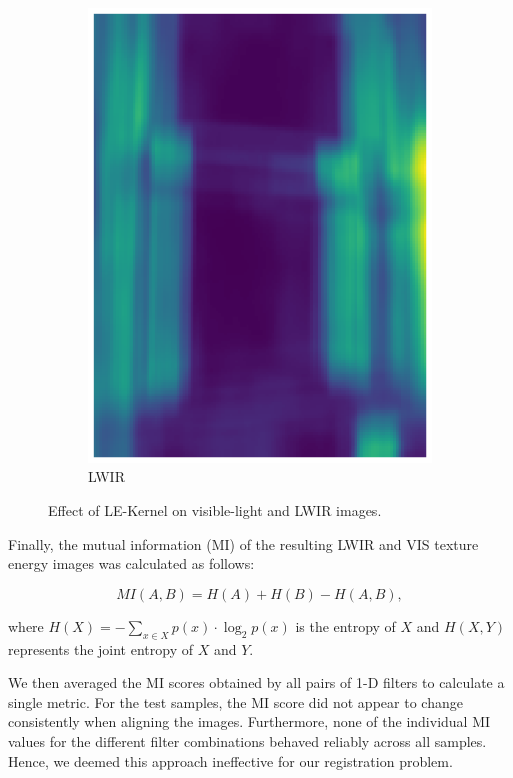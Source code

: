 \documentclass{l4proj}
\begin{document}
\begin{figure}[ht]
\begin{subfigure}[h!]{0.25\textwidth}
    \includegraphics[width=\textwidth]{images/registration/filtered_le_lwir.png}
    \caption{LWIR}
  \end{subfigure}
  \caption{Effect of LE-Kernel \citep{laws_rapid_1980} on visible-light and LWIR images.}
  \label{fig:le_filter}
\end{figure}

Finally, the mutual information (MI) of the resulting LWIR and VIS texture energy images was calculated as follows:

\begin{equation}
  MI(A,B) = H(A) + H(B) - H(A,B),
\end{equation}

where $H(X) = - \sum_{x \in X} p(x) \cdot \log_2 p(x)$ is the entropy of $X$ and $H(X,Y)$ represents the joint entropy of $X$ and $Y$.

We then averaged the MI scores obtained by all pairs of 1-D filters to calculate a single metric. For the test samples, the MI score did not appear to change consistently when aligning the images. Furthermore, none of the individual MI values for the different filter combinations behaved reliably across all samples. Hence, we deemed this approach ineffective for our registration problem.
\end{document}

